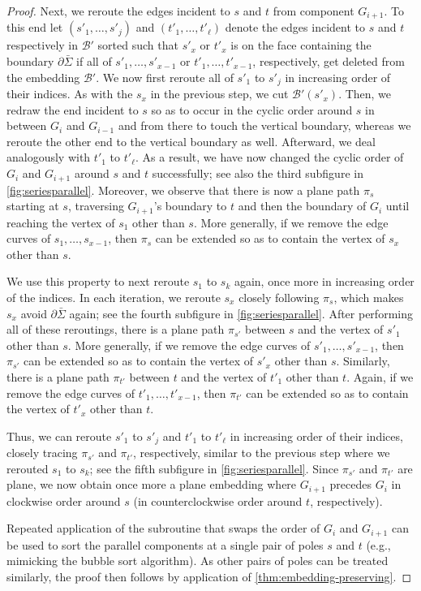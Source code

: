 \documentclass[a4paper,USenglish,cleveref,colorlinks=true,urlcolor=black,linkcolor=black,citecolor=black,thm-restate,authorcolumns]{lipics-v2021}
\theoremstyle{claimstyle}
\begin{document}
\begin{proof}
    Next, we reroute the edges incident to $s$ and $t$ from component $G_{i+1}$.
    To this end let $(s'_1,\ldots,s'_j)$ and $(t'_1,\ldots,t'_\ell)$ denote the edges incident to $s$ and $t$ respectively in $\mathcal{B}'$ sorted such that $s'_x$ or $t'_x$ is on the face containing the boundary $\partial\bar\Sigma$ if all of $s'_1,\ldots,s'_{x-1}$ or $t'_1,\ldots,t'_{x-1}$, respectively, get deleted from the embedding $\mathcal{B}'$.
    We now first reroute all of $s'_1$ to $s'_j$ in increasing order of their indices.
    As with the $s_x$ in the previous step, we cut $\mathcal{B}'(s'_x)$.
    Then, we redraw the end incident to $s$ so as to occur in the cyclic order around $s$ in between $G_i$ and $G_{i-1}$ and from there to touch the vertical boundary, whereas we reroute the other end to the vertical boundary as well.
    Afterward, we deal analogously with $t'_1$ to $t'_\ell$.
    As a result, we have now changed the cyclic order of $G_i$ and $G_{i+1}$ around $s$ and $t$ successfully; see also the third subfigure in \cref{fig:seriesparallel}.
    Moreover, we observe that there is now a plane path $\pi_s$ starting at $s$, traversing $G_{i+1}$'s boundary to $t$ and then the boundary of $G_i$ until reaching the vertex of $s_1$ other than $s$.
    More generally, if we remove the edge curves of $s_1, \ldots, s_{x-1}$, then $\pi_s$ can be extended so as to contain the vertex of $s_x$ other than $s$.

    We use this property to next reroute $s_1$ to $s_k$ again, once more in increasing order of the indices.
    In each iteration, we reroute $s_x$ closely following $\pi_s$, which makes $s_x$ avoid $\partial \bar{\Sigma}$ again; see the fourth subfigure in \cref{fig:seriesparallel}.
    After performing all of these reroutings, there is a plane path $\pi_{s'}$ between $s$ and the vertex of $s'_1$ other than $s$.
    More generally, if we remove the edge curves of $s'_1,\ldots,s'_{x-1}$, then $\pi_{s'}$ can be extended so as to contain the vertex of $s'_x$ other than $s$.
    Similarly, there is a plane path $\pi_{t'}$ between $t$ and the vertex of $t'_1$ other than $t$.
    Again, if we remove the edge curves of $t'_1,\ldots,t'_{x-1}$, then $\pi_{t'}$ can be extended so as to contain the vertex of $t'_x$ other than $t$.

    Thus, we can reroute $s'_1$ to $s'_j$ and $t'_1$ to $t'_\ell$ in increasing order of their indices, closely tracing $\pi_{s'}$ and $\pi_{t'}$, respectively, similar to the previous step where we rerouted $s_1$ to $s_k$; see the fifth subfigure in \cref{fig:seriesparallel}.
    Since $\pi_{s'}$ and $\pi_{t'}$ are plane, we now obtain once more a plane embedding where $G_{i+1}$ precedes $G_i$ in clockwise order around $s$ (in counterclockwise order around $t$, respectively).

    Repeated application of the subroutine that swaps the order of $G_i$ and $G_{i+1}$ can be used to sort the parallel components at a single pair of poles $s$ and $t$ (e.g., mimicking the bubble sort algorithm).
    As other pairs of poles can be treated similarly, the proof then follows by application of \cref{thm:embedding-preserving}.
\end{proof}
\end{document}
